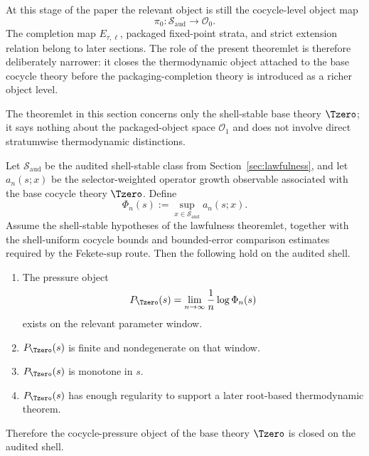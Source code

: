 At this stage of the paper the relevant object is still the cocycle-level object map
\[
\pi_0:\mathcal{S}_{\mathrm{aud}}\to \mathcal{O}_0.
\]
The completion map \(E_{\tau,\ell}\), packaged fixed-point strata, and strict extension relation belong to later sections. The role of the present theoremlet is therefore deliberately narrower: it closes the thermodynamic object attached to the base cocycle theory before the packaging-completion theory is introduced as a richer object level.

The theoremlet in this section concerns only the shell-stable base theory \(\Tzero\); it says nothing about the packaged-object space \(\mathcal{O}_1\) and does not involve direct stratumwise thermodynamic distinctions.

\begin{theorem}\label{thm:cocycle-pressure}
Let \(\mathcal{S}_{\mathrm{aud}}\) be the audited shell-stable class from Section~\ref{sec:lawfulness}, and let \(a_n(s;x)\) be the selector-weighted operator growth observable associated with the base cocycle theory \(\Tzero\). Define
\[
\Phi_n(s):=\sup_{x\in\mathcal{S}_{\mathrm{aud}}} a_n(s;x).
\]
Assume the shell-stable hypotheses of the lawfulness theoremlet, together with the shell-uniform cocycle bounds and bounded-error comparison estimates required by the Fekete-sup route. Then the following hold on the audited shell.

\begin{enumerate}
    \item The pressure object
    \[
    P_{\Tzero}(s)=\lim_{n\to\infty}\frac{1}{n}\log \Phi_n(s)
    \]
    exists on the relevant parameter window.
    \item \(P_{\Tzero}(s)\) is finite and nondegenerate on that window.
    \item \(P_{\Tzero}(s)\) is monotone in \(s\).
    \item \(P_{\Tzero}(s)\) has enough regularity to support a later root-based thermodynamic theorem.
\end{enumerate}

Therefore the cocycle-pressure object of the base theory \(\Tzero\) is closed on the audited shell.
\end{theorem}

